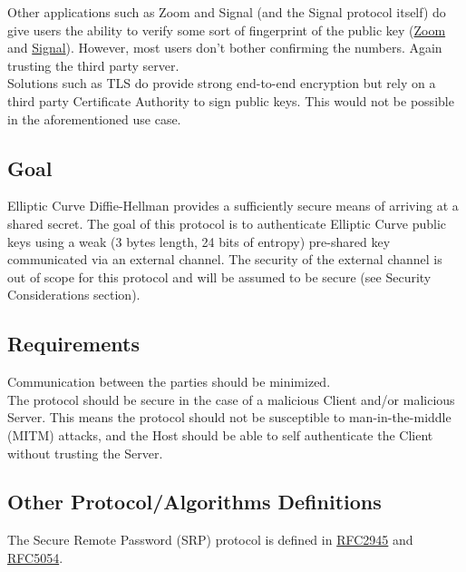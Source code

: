 \documentclass{article}
\begin{document}
    Other applications such as Zoom and Signal (and the Signal protocol itself) do
    give users the ability to verify some sort of fingerprint of the public key
    (\href{https://support.zoom.us/hc/en-us/articles/360048660871-End-to-end-E2EE-encryption-for-meetings#h_01ENGDKFFBKTF796CE03FTCH6J}{Zoom}
    and \href{https://signal.org/blog/safety-number-updates/}{Signal}). However, most
    users don't bother confirming the numbers. Again trusting the third party
    server.\\

    Solutions such as TLS do provide strong end-to-end encryption but rely on a
    third party Certificate Authority to sign public keys. This would not be
    possible in the aforementioned use case.\\

    \subsection{Goal}

    Elliptic Curve Diffie-Hellman provides a sufficiently secure means of arriving
    at a shared secret. The goal of this protocol is to authenticate Elliptic Curve public keys
    using a weak (3 bytes length, 24 bits of entropy) pre-shared key communicated
    via an external channel. The security of the external channel is out of scope
    for this protocol and will be assumed to be secure (see Security Considerations
    section).\\

    \subsection{Requirements}

    Communication between the parties should be minimized.\\

    The protocol should be secure in the case of a malicious Client and/or malicious
    Server. This means the protocol should not be susceptible to man-in-the-middle
    (MITM) attacks, and the Host should be able to self authenticate the Client
    without trusting the Server.\\

    \subsection{Other Protocol/Algorithms Definitions}

    The Secure Remote Password (SRP) protocol is defined in
    \href{(https://datatracker.ietf.org/doc/html/rfc2945}{RFC2945} and
    \href{https://datatracker.ietf.org/doc/html/rfc5054}{RFC5054}.\\
\end{document}
